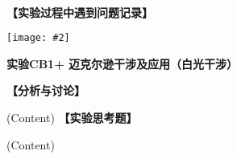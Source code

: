 \documentclass[11pt,a4paper]{ctexart}
\newcommand{\ExpeName}{实验CB1+ 迈克尔逊干涉及应用（白光干涉）}
\newcommand{\cpic}[2]{
\begin{center}
\texttt{[image: \#2]}
\end{center}
}
\newcommand{\emptyline}{\par \ \\}
\begin{document}
\emptyline
\textbf{【实验过程中遇到问题记录】}

%

\newpage%
\cpic{0.255}{e3}%
\begin{center}
\LARGE\textbf{{\ExpeName}}
\end{center}
\textbf{【分析与讨论】}\par
(Content)
\newline
\textbf{【实验思考题】}\par
(Content)
\end{document}
